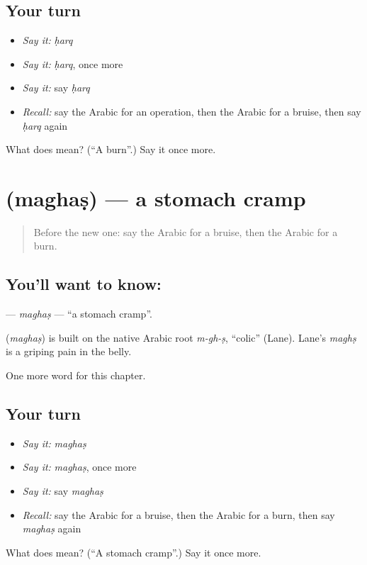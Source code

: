 \subsection*{Your turn}
\begin{itemize}
\raggedright
  \item \emph{Say it:} \emph{ḥarq}
  \item \emph{Say it:} \emph{ḥarq}, once more
  \item \emph{Say it:} say \emph{ḥarq}
  \item \emph{Recall:} say the Arabic for an operation, then the Arabic for a bruise, then say \emph{ḥarq} again
\end{itemize}

\begin{tcolorbox}[breakable,colback=teal!4,colframe=teal!35!black,title={Before you move on}]
What does  mean? (\textquotedblleft{}A burn\textquotedblright{}.) Say it once more.
\end{tcolorbox}
\section[\texorpdfstring{\ar{مغص} (maghaṣ)}{مغص (maghaṣ)}]{ (maghaṣ) — a stomach cramp}

\label{lesson:AR-C201-maghas}



\begin{quote}
Before the new one: say the Arabic for a bruise, then the Arabic for a burn.
\end{quote}

\subsection*{You'll want to know: }
\textbf{} — \emph{maghaṣ} — \textquotedblleft{}a stomach cramp\textquotedblright{}.

\begin{cousinweb}
\textbf{} (\emph{maghaṣ}) is built on the native Arabic root \emph{m-gh-ṣ}, \textquotedblleft{}colic\textquotedblright{} (Lane). Lane's \emph{maghṣ} is a griping pain in the belly.
\end{cousinweb}

\begin{grammarlens}[title={What you've built}]
One more word for this chapter.
\end{grammarlens}

\subsection*{Your turn}
\begin{itemize}
\raggedright
  \item \emph{Say it:} \emph{maghaṣ}
  \item \emph{Say it:} \emph{maghaṣ}, once more
  \item \emph{Say it:} say \emph{maghaṣ}
  \item \emph{Recall:} say the Arabic for a bruise, then the Arabic for a burn, then say \emph{maghaṣ} again
\end{itemize}

\begin{tcolorbox}[breakable,colback=teal!4,colframe=teal!35!black,title={Before you move on}]
What does  mean? (\textquotedblleft{}A stomach cramp\textquotedblright{}.) Say it once more.
\end{tcolorbox}

